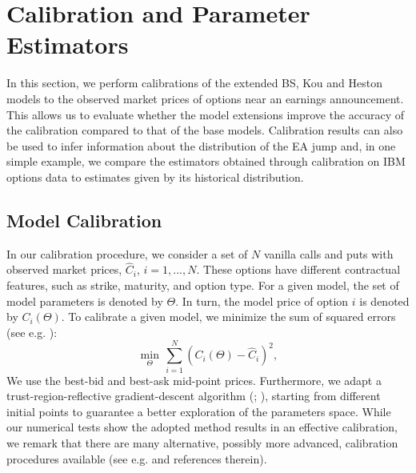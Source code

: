 \documentclass[11pt]{article}
\numberwithin{equation}{section}
\numberwithin{theorem}{section}
\begin{document}
\section{Calibration and Parameter Estimators\label{sec:calibration}}

In this section, we perform  calibrations of the extended
BS, Kou and Heston models to  the observed market prices of options near an earnings announcement. This allows us to   evaluate whether
the model extensions improve the accuracy of the calibration compared
to that of the base models. Calibration results can also be used to
infer information about the distribution of the EA jump and, in one
simple example, we compare the estimators obtained through calibration
on IBM options data to estimates given by its historical distribution. 


\subsection{Model Calibration\label{sub:calibration}}
In our calibration procedure, we consider  a set of $N$ vanilla calls and puts with observed market prices,  $\hat{C}_{i}$, $i=1,...,N$. These  options have different  contractual features, such as strike, maturity, and option type. For a given  model,  the set of model parameters is denoted by $\Theta$. In turn, the model price of   option  $i$ is denoted by $C_i\left(\Theta\right)$.  To calibrate a given  model, we minimize the sum of squared errors (see e.g. \citet{Dennis1977,Andersen2000,Bates1996,Cont2002}):
\begin{equation}
\min_{\Theta}\limits  \, \sum_{i=1}^{N}\left(C_i\left(\Theta\right)-\hat{C}_{i}\right)^{2},\label{eq:cal_problem}
\end{equation}
We use the best-bid and best-ask mid-point prices. Furthermore, we  adapt  a trust-region-reflective gradient-descent algorithm (\citet{Coleman1994}; \citet{Coleman1996}), starting from different initial points to guarantee a better exploration of the parameters space. While  our  numerical tests show the adopted method  results in an effective calibration, we  remark that there are many alternative, possibly more advanced, calibration procedures available (see e.g. \cite{Cont2002} and references therein). 
\end{document}
